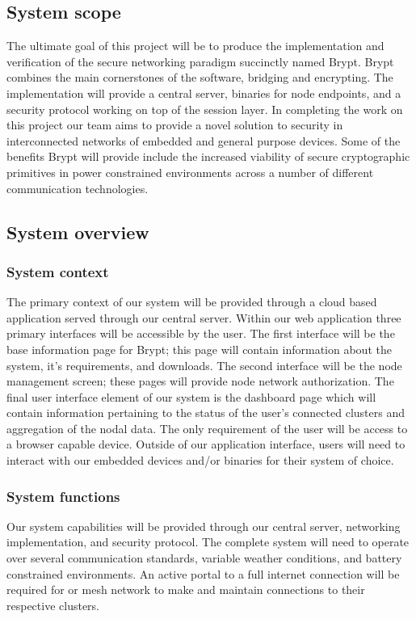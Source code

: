 \documentclass[tikz,a4paper,titlepage]{article}
\begin{document}
\subsection{System scope}
The ultimate goal of this project will be to produce the implementation and verification of the secure networking paradigm succinctly named Brypt. Brypt combines the main cornerstones of the software, bridging and encrypting. The implementation will provide a central server, binaries for node endpoints, and a security protocol working on top of the session layer. In completing the work on this project our team aims to provide a novel solution to security in interconnected networks of embedded and general purpose devices. Some of the benefits Brypt will provide include the increased viability of secure cryptographic primitives in power constrained environments across a number of different communication technologies. 

\subsection{System overview}
\subsubsection{System context}
The primary context of our system will be provided through a cloud based application served through our central server. Within our web application three primary interfaces will be accessible by the user. The first interface will be the base information page for Brypt; this page will contain information about the system, it’s requirements, and downloads. The second interface will be the node management screen; these pages will provide node network authorization. The final user interface element of our system is the dashboard page which will contain information pertaining to the status of the user’s connected clusters and aggregation of the nodal data. The only requirement of the user will be access to a browser capable device. Outside of our application interface, users will need to interact with our embedded devices and/or binaries for their system of choice. 

\subsubsection{System functions}
Our system capabilities will be provided through our central server, networking implementation, and security protocol. The complete system will need to operate over several communication standards, variable weather conditions, and battery constrained environments. An active portal to a full internet connection will be required for or mesh network to make and maintain connections to their respective clusters.
\end{document}
